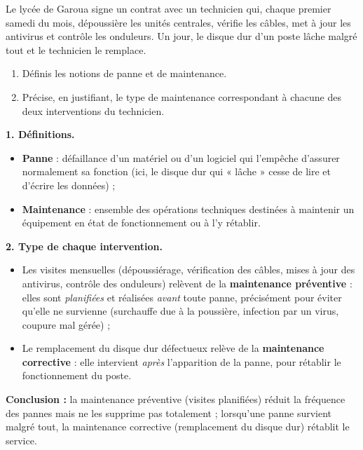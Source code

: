 \documentclass[11pt]{article}
\begin{document}
\begin{exoresolu}
Le lycée de Garoua signe un contrat avec un technicien qui, chaque premier samedi du mois, dépoussière les unités centrales, vérifie les câbles, met à jour les antivirus et contrôle les onduleurs. Un jour, le disque dur d'un poste lâche malgré tout et le technicien le remplace.
\begin{enumerate}
\item Définis les notions de panne et de maintenance.
\item Précise, en justifiant, le type de maintenance correspondant à chacune des deux interventions du technicien.
\end{enumerate}
\tcblower
\textbf{1. Définitions.}
\begin{itemize}
\item \textbf{Panne} : défaillance d'un matériel ou d'un logiciel qui l'empêche d'assurer normalement sa fonction (ici, le disque dur qui « lâche » cesse de lire et d'écrire les données) ;
\item \textbf{Maintenance} : ensemble des opérations techniques destinées à maintenir un équipement en état de fonctionnement ou à l'y rétablir.
\end{itemize}
\textbf{2. Type de chaque intervention.}
\begin{itemize}
\item Les visites mensuelles (dépoussiérage, vérification des câbles, mises à jour des antivirus, contrôle des onduleurs) relèvent de la \textbf{maintenance préventive} : elles sont \emph{planifiées} et réalisées \emph{avant} toute panne, précisément pour éviter qu'elle ne survienne (surchauffe due à la poussière, infection par un virus, coupure mal gérée) ;
\item Le remplacement du disque dur défectueux relève de la \textbf{maintenance corrective} : elle intervient \emph{après} l'apparition de la panne, pour rétablir le fonctionnement du poste.
\end{itemize}
\textbf{Conclusion :} la maintenance préventive (visites planifiées) réduit la fréquence des pannes mais ne les supprime pas totalement ; lorsqu'une panne survient malgré tout, la maintenance corrective (remplacement du disque dur) rétablit le service.
\end{exoresolu}
\end{document}
